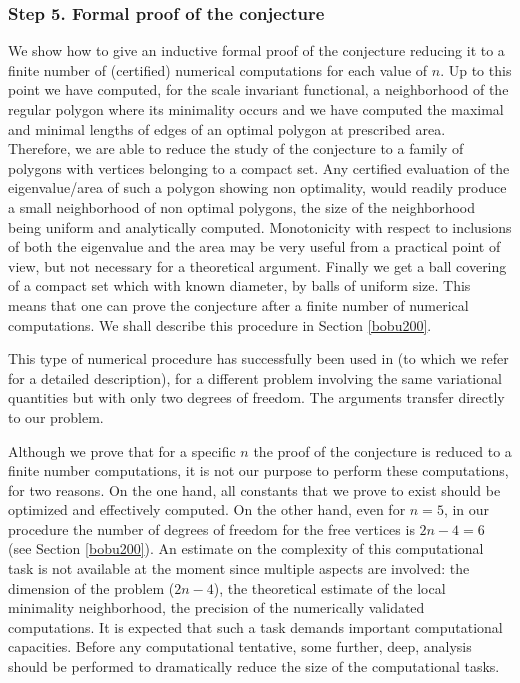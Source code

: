 \subsubsection*{Step 5. Formal proof of the conjecture}
We show how to give an inductive formal proof of the conjecture reducing it to a finite number of (certified) numerical computations for each value of $n$. Up to this point we have computed, for the scale invariant functional, a neighborhood of the regular polygon where its minimality occurs and we have computed the maximal and minimal lengths of edges of an optimal polygon at prescribed area. Therefore, we are able to reduce the study of the conjecture to a family of polygons
with vertices belonging to a compact set. Any certified evaluation of the eigenvalue/area of such a polygon showing non optimality, would readily produce a small neighborhood of non optimal polygons, the size of the neighborhood being uniform and analytically computed. Monotonicity with respect to inclusions of both the eigenvalue and the area may be very useful from a practical point of view, but not necessary for a theoretical argument. Finally we get a ball covering of a compact set which with known diameter, by balls of uniform size. This means that one can prove the conjecture after a finite number of numerical computations. We shall describe this procedure in Section \ref{bobu200}.

This type of numerical procedure has successfully been used in \cite{BF16} (to which we refer for a detailed description), for a different problem involving the same variational quantities but with only two degrees of freedom. The arguments transfer directly to our problem.

Although we prove that for a specific $n$ the proof of the conjecture is reduced to a finite number computations, it is not our purpose to perform these computations, for two reasons. On the one hand, all constants that we prove to exist should be optimized and effectively computed. On the other hand, even for $n=5$, in our procedure the number of degrees of freedom for the free vertices is $2n-4=6$ (see Section \ref{bobu200}). An estimate on the complexity of this computational task is not available at the moment since multiple aspects are involved: the dimension of the problem ($2n-4$), the theoretical estimate of the local minimality neighborhood, the precision of the numerically validated computations. It is expected that such a task demands important computational capacities. Before any computational tentative, some further, deep, analysis should be performed to dramatically reduce the size of the computational tasks.

